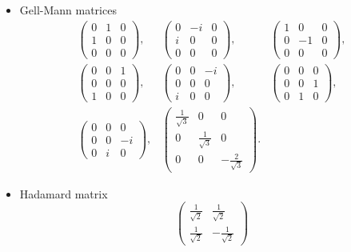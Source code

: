 \documentclass[final,3p,times]{elsarticle}
\newcommand{\1}{{\rm 1\hspace{-0.9mm}l}}
\begin{document}
\begin{itemize}
\item Gell-Mann matrices
\begin{eqnarray}\nonumber
\left(
\begin{array}{ccc}
 0 & 1 & 0 \\
 1 & 0 & 0 \\
 0 & 0 & 0
\end{array}
\right),&\left(
\begin{array}{ccc}
 0 & -i & 0 \\
 i & 0 & 0 \\
 0 & 0 & 0
\end{array}
\right),&\left(
\begin{array}{ccc}
 1 & 0 & 0 \\
 0 & -1 & 0 \\
 0 & 0 & 0
\end{array}
\right),
\\\nonumber
\left(
\begin{array}{ccc}
 0 & 0 & 1 \\
 0 & 0 & 0 \\
 1 & 0 & 0
\end{array}
\right),&\left(
\begin{array}{ccc}
 0 & 0 & -i \\
 0 & 0 & 0 \\
 i & 0 & 0
\end{array}
\right),&\left(
\begin{array}{ccc}
 0 & 0 & 0 \\
 0 & 0 & 1 \\
 0 & 1 & 0
\end{array}
\right),
\\
\left(
\begin{array}{ccc}
 0 & 0 & 0 \\
 0 & 0 & -i \\
 0 & i & 0
\end{array}
\right),&\left(
\begin{array}{ccc}
 \frac{1}{\sqrt{3}} & 0 & 0 \\
 0 & \frac{1}{\sqrt{3}} & 0 \\
 0 & 0 & -\frac{2}{\sqrt{3}}
\end{array}
\right).
\end{eqnarray}
\item Hadamard matrix 
\begin{equation}
\left(
\begin{array}{cc}
 \frac{1}{\sqrt{2}} & \frac{1}{\sqrt{2}} \\
 \frac{1}{\sqrt{2}} & -\frac{1}{\sqrt{2}}
\end{array}
\right)
\end{equation}
\end{itemize}
\end{document}
